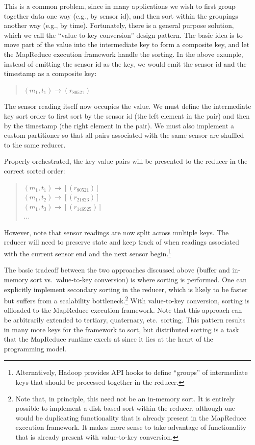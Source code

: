 \documentclass[11pt]{article}
\begin{document}
This is a common problem, since in many applications we wish to first
group together data one way (e.g., by sensor id), and then sort within
the groupings another way (e.g., by time).  Fortunately, there is a
general purpose solution, which we call the ``value-to-key
conversion'' design pattern.  The basic idea is to move part of the
value into the intermediate key to form a composite key, and let the
MapReduce execution framework handle the sorting.  In the above
example, instead of emitting the sensor id as the key, we would emit
the sensor id and the timestamp as a composite key:

\begin{quote}
$(m_1, t_1) \rightarrow (r_{80521})$
\end{quote}

\noindent The sensor reading itself now occupies the value.  We must
define the intermediate key sort order to first sort by the sensor id
(the left element in the pair) and then by the timestamp (the right
element in the pair).  We must also implement a custom partitioner so
that all pairs associated with the same sensor are shuffled to the
same reducer.

Properly orchestrated, the key-value pairs will be presented to the
reducer in the correct sorted order:

\begin{quote}
$(m_1, t_1) \rightarrow [(r_{80521})]$ \\
$(m_1, t_2) \rightarrow [(r_{21823})]$ \\
$(m_1, t_3) \rightarrow [(r_{146925})]$ \\
$\ldots$
\end{quote}

\noindent However, note that sensor readings are now split across
multiple keys.  The reducer will need to preserve state and keep track
of when readings associated with the current sensor end and the next
sensor begin.\footnote{Alternatively, Hadoop provides API hooks to
  define ``groups'' of intermediate keys that should be processed
  together in the reducer.}

The basic tradeoff between the two approaches discussed above (buffer
and in-memory sort vs.\ value-to-key conversion) is where sorting is
performed.  One can explicitly implement secondary sorting in the
reducer, which is likely to be faster but suffers from a scalability
bottleneck.\footnote{Note that, in principle, this need not be an
  in-memory sort.  It is entirely possible to implement a disk-based
  sort within the reducer, although one would be duplicating
  functionality that is already present in the MapReduce execution
  framework.  It makes more sense to take advantage of functionality
  that is already present with value-to-key conversion.}  With
value-to-key conversion, sorting is offloaded to the MapReduce
execution framework.  Note that this approach can be arbitrarily
extended to tertiary, quaternary, etc.\ sorting.  This pattern results
in many more keys for the framework to sort, but distributed sorting
is a task that the MapReduce runtime excels at since it lies at the
heart of the programming model.
\end{document}

